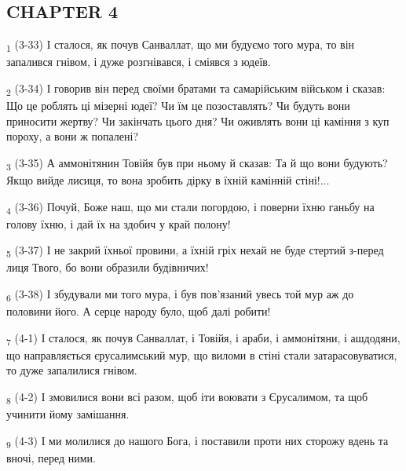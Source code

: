 \subsection{CHAPTER 4}
\begin{tcolorbox}
\textsubscript{1} (3-33) І сталося, як почув Санваллат, що ми будуємо того мура, то він запалився гнівом, і дуже розгнівався, і сміявся з юдеїв.
\end{tcolorbox}
\begin{tcolorbox}
\textsubscript{2} (3-34) І говорив він перед своїми братами та самарійським військом і сказав: Що це роблять ці мізерні юдеї? Чи їм це позоставлять? Чи будуть вони приносити жертву? Чи закінчать цього дня? Чи оживлять вони ці каміння з куп пороху, а вони ж попалені?
\end{tcolorbox}
\begin{tcolorbox}
\textsubscript{3} (3-35) А аммонітянин Товійя був при ньому й сказав: Та й що вони будують? Якщо вийде лисиця, то вона зробить дірку в їхній камінній стіні!...
\end{tcolorbox}
\begin{tcolorbox}
\textsubscript{4} (3-36) Почуй, Боже наш, що ми стали погордою, і поверни їхню ганьбу на голову їхню, і дай їх на здобич у край полону!
\end{tcolorbox}
\begin{tcolorbox}
\textsubscript{5} (3-37) І не закрий їхньої провини, а їхній гріх нехай не буде стертий з-перед лиця Твого, бо вони образили будівничих!
\end{tcolorbox}
\begin{tcolorbox}
\textsubscript{6} (3-38) І збудували ми того мура, і був пов'язаний увесь той мур аж до половини його. А серце народу було, щоб далі робити!
\end{tcolorbox}
\begin{tcolorbox}
\textsubscript{7} (4-1) І сталося, як почув Санваллат, і Товійя, і араби, і аммонітяни, і ашдодяни, що направляється єрусалимський мур, що виломи в стіні стали затарасовуватися, то дуже запалилися гнівом.
\end{tcolorbox}
\begin{tcolorbox}
\textsubscript{8} (4-2) І змовилися вони всі разом, щоб іти воювати з Єрусалимом, та щоб учинити йому замішання.
\end{tcolorbox}
\begin{tcolorbox}
\textsubscript{9} (4-3) І ми молилися до нашого Бога, і поставили проти них сторожу вдень та вночі, перед ними.
\end{tcolorbox}
